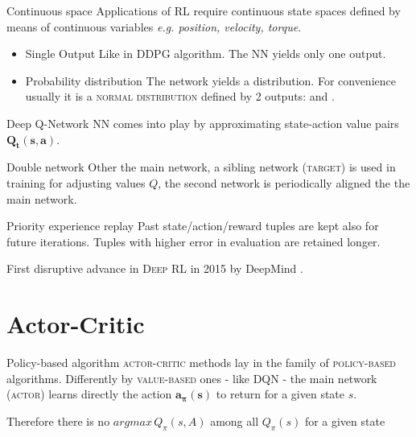 \documentclass[10pt]{beamer}
\begin{document}
\begin{frame}{Continuous space}
	Applications of \textsc{RL} require continuous state spaces defined by means of continuous variables \textit{e.g. position, velocity, torque}. 
	\begin{itemize}
		\item \begin{alertblock}{Single Output}		
				Like in \textsc{DDPG} algorithm. The \textsc{NN} yields only one output.
			\end{alertblock}
		\pause
		\item \begin{alertblock}{Probability distribution}
The network yields a distribution. For convenience usually it is a \textsc{normal distribution} defined by 2 outputs: \textsc{\textmugreek}  and \textsc{\textsigma}.		
			\end{alertblock}			
	\end{itemize}		
\end{frame}
\begin{frame}{Deep Q-Network}
	\textsc{NN} comes into play by approximating state-action value pairs $\mathbf{Q_t(s, a)}$.
	
	\begin{alertblock}{Double network}
	Other the main network, a sibling network (\textsc{target}) is used in training for adjusting values $Q$, the second network is periodically aligned the the main network.	 
	\end{alertblock}
	\begin{alertblock}{Priority experience replay}
	Past state/action/reward tuples are kept also for future iterations. Tuples with higher error in evaluation are retained longer. 
	\end{alertblock}
	\faBullhorn\hspace{2pt}First disruptive advance in \textsc{Deep RL} in 2015 by DeepMind
	\cite{mnih2015human}. 
\end{frame}

\section{Actor-Critic}
\begin{frame}{Policy-based algorithm}
	\textsc{actor-critic} methods lay in the family of \textsc{policy-based} algorithms.
	Differently by \textsc{value-based} ones - like \textsc{DQN} - the main network (\textsc{actor}) learns directly the action $\mathbf{a_\pi (s)}$ to return for a given state $s$.
	
	\faBullhorn\vspace{2pt} Therefore there is no $argmax\,Q_\pi(s, A)$ among all $Q_\pi(s)$ for a given state
\end{frame}
\end{document}
